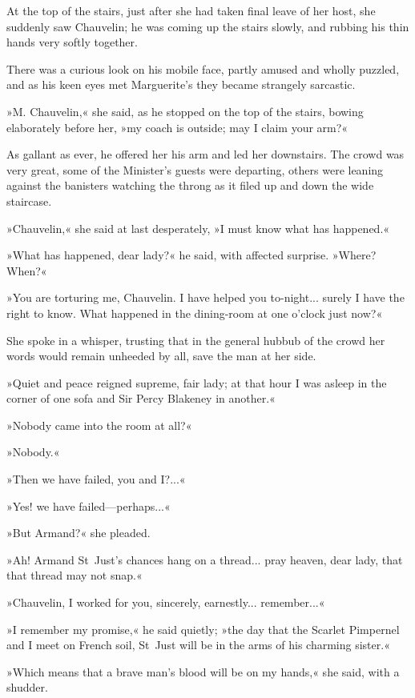 At the top of the stairs, just after she had taken final leave of her host, she suddenly saw Chauvelin; he was coming up the stairs slowly, and rubbing his thin hands very softly together.

There was a curious look on his mobile face, partly amused and wholly puzzled, and as his keen eyes met Marguerite's they became strangely sarcastic.

»M. Chauvelin,« she said, as he stopped on the top of the stairs, bowing elaborately before her, »my coach is outside; may I claim your arm?«

As gallant as ever, he offered her his arm and led her downstairs. The crowd was very great, some of the Minister's guests were departing, others were leaning against the banisters watching the throng as it filed up and down the wide staircase.

»Chauvelin,« she said at last desperately, »I must know what has happened.«

»What has happened, dear lady?« he said, with affected surprise. »Where? When?«

»You are torturing me, Chauvelin. I have helped you to-night... surely I have the right to know. What happened in the dining-room at one o'clock just now?«

She spoke in a whisper, trusting that in the general hubbub of the crowd her words would remain unheeded by all, save the man at her side.

»Quiet and peace reigned supreme, fair lady; at that hour I was asleep in the corner of one sofa and Sir Percy Blakeney in another.«

»Nobody came into the room at all?«

»Nobody.«

»Then we have failed, you and I?...«

»Yes! we have failed\allowbreak---\allowbreak perhaps...«

»But Armand?« she pleaded.

»Ah! Armand St~Just's chances hang on a thread... pray heaven, dear lady, that that thread may not snap.«

»Chauvelin, I worked for you, sincerely, earnestly... remember...«

»I remember my promise,« he said quietly; »the day that the Scarlet Pimpernel and I meet on French soil, St~Just will be in the arms of his charming sister.«

»Which means that a brave man's blood will be on my hands,« she said, with a shudder.

